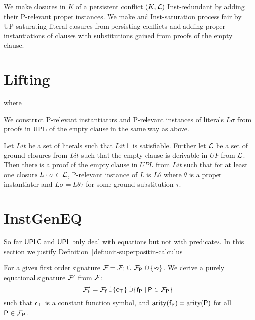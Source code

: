     We make closures in \( K \)
    of a persistent conflict \( (K,\mathcal{L}) \)
    Inst-redundant by adding their P-relevant proper instances.
    We make and Inst-saturation process fair
    by UP-saturating literal closures from persisting conflicts
    and adding proper instantiations of clauses with substitutions
    gained from proofs of the empty clause.


    \section{Lifting}\label{sec:lifting}

    \begin{definition}\label{def:unit:paramodulation}
        
         where
        
        \end{definition}

    We construct P-relevant instantiators and P-relevant instances
    of literals \( L\sigma \) from proofs in UPL of the empty clause
    in the same way as above.

    \begin{lemma}
        Let \(Lit\) be a set of literals such that \( Lit\bot \) is satisfiable.
        Further let \( \mathcal{L} \) be a set of ground closures from \( Lit \)
        such that the empty clause is derivable in \( UP \) from \( \mathcal{L} \).
        Then there is a proof of the empty clause in \( UPL \) from \( Lit \)
        such that for at least one closure \( L \cdot \sigma \in \mathcal{L} \),
        P-relevant instance of \(L\) is \( L\theta \)
        where \( \theta \) is a proper instantiator
        and \( L\sigma = L\theta\tau \) for some ground substitution \( \tau \).
    \end{lemma}

    \section{InstGenEQ}

    So far \( \mathsf{UPLC} \) and \( \mathsf{UPL} \) only deal
    with equations but not with predicates.
    In this section we justify Definition~\vref{def:unit-superpositin-calculus}

    \begin{definition}
        For a given first order signature \( \mathcal{F} = {\mathcal{F}_{\mathsf{f}}} \, \mathop{\dot\cup} \, {\mathcal{F}_{\mathsf{P}}} \, \mathop{\dot\cup} \, \{\approx \} \).
        We derive a purely equational signature \( \mathcal{F}' \) from \( \mathcal{F} \):
        \[
            \mathcal{F}'_{\mathsf{f}} = {\mathcal{F}_{\mathsf{f}}}
            \mathop{\dot\cup}
            \{ \mathsf{c}_\top \}
            \mathop{\dot\cup}
            \{ \mathsf{f}_{\mathsf{P}} \mid \mathsf{P} \in {\mathcal{F}_{\mathsf{P}}} \}
            \]
        such that \( \mathsf{c}_\top \) is a constant function symbol,
        and \( \operatorname{arity}(\mathsf{f}_{\mathsf{P}}) = \operatorname{arity}(\mathsf{P}) \) for all \( \mathsf{P} \in {\mathcal{F}_{\mathsf{P}}} \).

    \end{definition}

